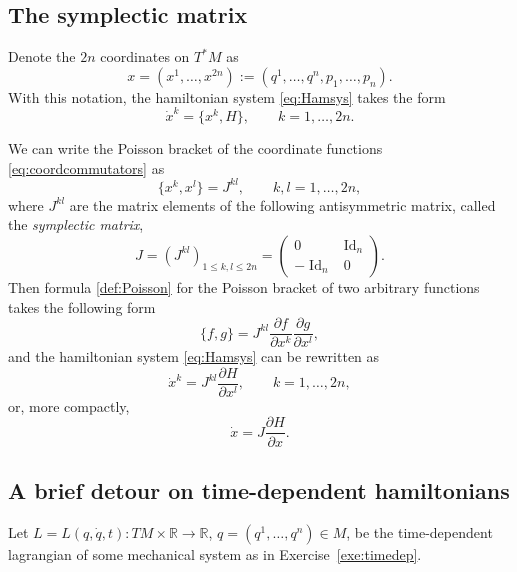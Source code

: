 \documentclass[english,fontsize=11pt,paper=a5,oneside]{scrbook}
\newcommand{\R}{\mathbb{R}}
\DeclareMathOperator{\Id}{Id}
\theoremstyle{definition}
\begin{document}
\subsection{The symplectic matrix}\label{sec:symplmat}
Denote the $2n$ coordinates on $T^*M$ as
\begin{equation}
  x=(x^1, \ldots, x^{2n}) := (q^1, \ldots, q^n, p_1, \ldots, p_n).
\end{equation}
With this notation, the hamiltonian system \eqref{eq:Hamsys} takes the form
\begin{equation}
  \dot x^k = \big\{x^k, H\big\}, \qquad k=1,\ldots,2n.
\end{equation}

We can write the Poisson bracket of the coordinate functions \eqref{eq:coordcommutators} as
\begin{equation}
  \big\{x^k, x^l\big\} = J^{kl}, \qquad k,l = 1,\ldots,2n,
\end{equation}
where $J^{kl}$ are the matrix elements of the following antisymmetric matrix, called the \emph{symplectic matrix},
\begin{equation}\label{eq:symmat}
  J = \left(J^{kl}\right)_{1\leq k,l\leq2n} = \begin{pmatrix}0 & \Id_n \\ -\Id_n & 0\end{pmatrix}.
\end{equation}
Then formula \eqref{def:Poisson} for the Poisson bracket of two arbitrary functions takes the following form
\begin{equation}\label{eq:coordPB}
  \big\{f,g\big\} = J^{kl} \frac{\partial f}{\partial x^k}\frac{\partial g}{\partial x^l},
\end{equation}
and the hamiltonian system \eqref{eq:Hamsys} can be rewritten as
\begin{equation}
  \dot x^k = J^{kl} \frac{\partial H}{\partial x^l}, \qquad k=1,\ldots,2n,
\end{equation}
or, more compactly,
\begin{equation}\label{eq:hamsysJ}
  \dot x = J \frac{\partial H}{\partial x}.
\end{equation}

\subsection{A brief detour on time-dependent hamiltonians}\label{sec:timedepH}

Let $L=L(q,\dot q,t): TM\times\R\to\R$, $q=(q^1,\ldots,q^n)\in M$, be the time-dependent lagrangian of some mechanical system as in Exercise~\ref{exe:timedep}.
\end{document}
